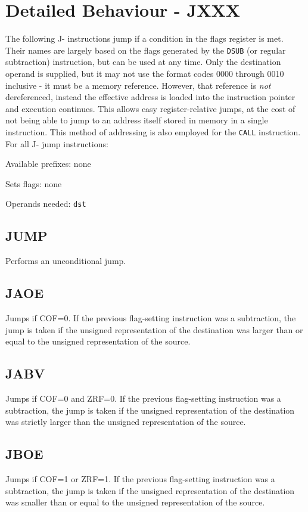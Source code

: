 \documentclass[12pt,a4paper]{report}
\begin{document}
\section{Detailed Behaviour - JXXX} \label{jumping}
The following J- instructions jump if a condition in the flags register is met. Their names are largely based on the flags generated by the \texttt{DSUB} (or regular subtraction) instruction, but can be used at any time. Only the destination operand is supplied, but it may not use the format codes 0000 through 0010 inclusive - it must be a memory reference. However, that reference is \emph{not} dereferenced, instead the effective address is loaded into the instruction pointer and execution continues. This allows easy register-relative jumps, at the cost of not being able to jump to an address itself stored in memory in a single instruction. This method of addressing is also employed for the \texttt{CALL} instruction. For all J- jump instructions:

Available prefixes: none

Sets flags: none

Operands needed: \texttt{dst}

\subsection*{JUMP}
Performs an unconditional jump.

\subsection*{JAOE}
Jumps if COF=0. If the previous flag-setting instruction was a subtraction, the jump is taken if the unsigned representation of the destination was larger than or equal to the unsigned representation of the source.

\subsection*{JABV}
Jumps if COF=0 and ZRF=0. If the previous flag-setting instruction was a subtraction, the jump is taken if the unsigned representation of the destination was strictly larger than the unsigned representation of the source.

\subsection*{JBOE}
Jumps if COF=1 or ZRF=1. If the previous flag-setting instruction was a subtraction, the jump is taken if the unsigned representation of the destination was smaller than or equal to the unsigned representation of the source.
\end{document}
